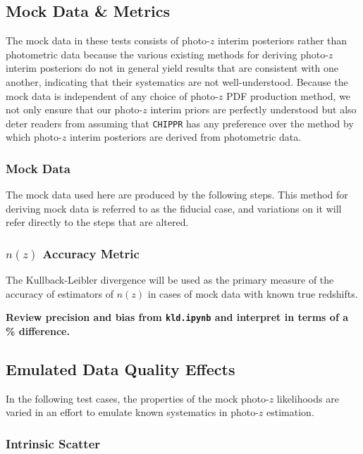 \documentclass[iop]{emulateapj}
\newcommand{\chippr}{\texttt{CHIPPR} }
\begin{document}
\subsection{Mock Data \& Metrics}
\label{sec:validintro}

The mock data in these tests consists of photo-$z$ interim posteriors rather 
than photometric data because the various existing methods for deriving 
photo-$z$ interim posteriors do not in general yield results that are 
consistent with one another, indicating that their systematics are not 
well-understood.  Because the mock data is independent of any choice of 
photo-$z$ PDF production method, we not only ensure that our photo-$z$ interim 
priors are perfectly understood but also deter readers from assuming that 
\chippr has any preference over the method by which photo-$z$ interim 
posteriors are derived from photometric data.

\subsubsection{Mock Data}
\label{sec:mockdata}

The mock data used here are produced by the following steps.  This method for 
deriving mock data is referred to as the fiducial case, and variations on it 
will refer directly to the steps that are altered.

\subsubsection{$n(z)$ Accuracy Metric}
\label{sec:accuracy}

The Kullback-Leibler divergence will be used as the primary measure of the 
accuracy of estimators of $n(z)$ in cases of mock data with known true 
redshifts.

\textbf{Review precision and bias from \texttt{kld.ipynb} and interpret in 
terms of a \% difference.}

\subsection{Emulated Data Quality Effects}
\label{sec:likelihoods}

In the following test cases, the properties of the mock photo-$z$ likelihoods 
are varied in an effort to emulate known systematics in photo-$z$ estimation.

\subsubsection{Intrinsic Scatter}
\label{sec:intscat}
\end{document}
